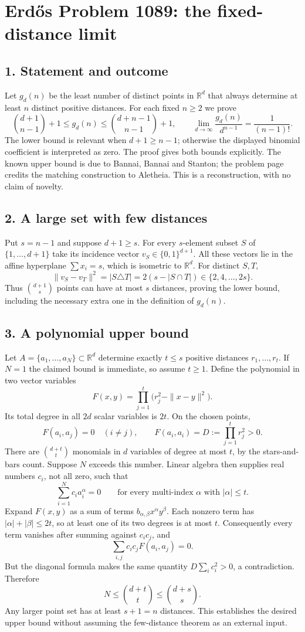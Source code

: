 \section*{Erd\H{o}s Problem 1089: the fixed-distance limit}
\subsection*{1. Statement and outcome}
Let $g_d(n)$ be the least number of distinct points in $\mathbb R^d$ that always determine at least $n$ distinct positive distances. For each fixed $n\ge2$ we prove
\[
 \binom{d+1}{n-1}+1\le g_d(n)\le\binom{d+n-1}{n-1}+1,
 \qquad \lim_{d\to\infty}\frac{g_d(n)}{d^{n-1}}=\frac1{(n-1)!}.
\]
The lower bound is relevant when $d+1\ge n-1$; otherwise the displayed binomial coefficient is interpreted as zero. The proof gives both bounds explicitly. The known upper bound is due to Bannai, Bannai and Stanton; the problem page credits the matching construction to Aletheia. This is a reconstruction, with no claim of novelty.

\subsection*{2. A large set with few distances}
Put $s=n-1$ and suppose $d+1\ge s$. For every $s$-element subset $S$ of $\{1,\ldots,d+1\}$ take its incidence vector $v_S\in\{0,1\}^{d+1}$. All these vectors lie in the affine hyperplane $\sum x_i=s$, which is isometric to $\mathbb R^d$. For distinct $S,T$,
\[
 \|v_S-v_T\|^2=|S\triangle T|=2(s-|S\cap T|)\in\{2,4,\ldots,2s\}.
\]
Thus $\binom{d+1}{s}$ points can have at most $s$ distances, proving the lower bound, including the necessary extra one in the definition of $g_d(n)$.

\subsection*{3. A polynomial upper bound}
Let $A=\{a_1,\ldots,a_N\}\subset\mathbb R^d$ determine exactly $t\le s$ positive distances $r_1,\ldots,r_t$. If $N=1$ the claimed bound is immediate, so assume $t\ge1$. Define the polynomial in two vector variables
\[
 F(x,y)=\prod_{j=1}^t\bigl(r_j^2-\|x-y\|^2\bigr).
\]
Its total degree in all $2d$ scalar variables is $2t$. On the chosen points,
\[
 F(a_i,a_j)=0\quad(i\ne j),\qquad F(a_i,a_i)=D:=\prod_{j=1}^t r_j^2>0.
\]
There are $\binom{d+t}{t}$ monomials in $d$ variables of degree at most $t$, by the stars-and-bars count. Suppose $N$ exceeds this number. Linear algebra then supplies real numbers $c_i$, not all zero, such that
\[
 \sum_{i=1}^N c_i a_i^\alpha=0\qquad\text{for every multi-index }\alpha\text{ with }|\alpha|\le t.
\]
Expand $F(x,y)$ as a sum of terms $b_{\alpha,\beta}x^\alpha y^\beta$. Each nonzero term has $|\alpha|+|\beta|\le2t$, so at least one of its two degrees is at most $t$. Consequently every term vanishes after summing against $c_i c_j$, and
\[
 \sum_{i,j}c_i c_j F(a_i,a_j)=0.
\]
But the diagonal formula makes the same quantity $D\sum_i c_i^2>0$, a contradiction. Therefore
\[
 N\le\binom{d+t}{t}\le\binom{d+s}{s}.
\]
Any larger point set has at least $s+1=n$ distances. This establishes the desired upper bound without assuming the few-distance theorem as an external input.

